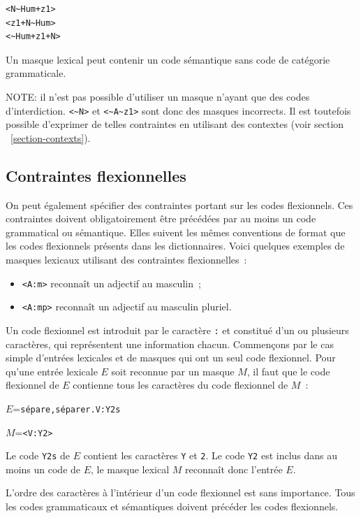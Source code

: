 \begin{verbatim}
<N~Hum+z1>
<z1+N~Hum>
<~Hum+z1+N>
\end{verbatim}

\noindent Un masque lexical peut contenir un code sémantique sans code de catégorie grammaticale.

\bigskip
\noindent NOTE: il n’est pas possible d’utiliser un masque n’ayant que des codes d'interdiction.
\verb+<~N>+ et \verb+<~A~z1>+ sont donc des masques incorrects.
Il est toutefois possible d’exprimer de telles contraintes en utilisant des contextes (voir section
~\ref{section-contexts}).


\subsection{Contraintes flexionnelles}
On peut également spécifier des contraintes portant sur les codes flexionnels. Ces con\-traintes
doivent obligatoirement être précédées par au moins un code grammatical ou sémantique. Elles suivent
les mêmes conventions de format que les codes flexionnels présents dans les dictionnaires.
Voici quelques exemples de masques lexicaux utilisant des contraintes flexionnelles~:

\begin{itemize}
  \item \verb+<A:m>+ reconnaît un adjectif au masculin~;
  \item \verb+<A:mp>+ reconnaît un adjectif au masculin pluriel.
\end{itemize}

\noindent Un code flexionnel est introduit par le caractère \verb+:+ et constitué d'un ou plusieurs
caractères, qui représentent une information chacun. Commençons par le cas simple d'entrées
lexicales et de masques qui ont un seul code flexionnel. Pour qu'une entrée lexicale $E$ soit reconnue
par un masque $M$, il faut que le code flexionnel de $E$ contienne tous les caractères du code flexionnel de $M$~:

\bigskip
$E$=\verb$sépare,séparer.V:Y2s$

$M$=\verb$<V:Y2>$

\bigskip
\noindent Le code \verb+Y2s+ de $E$ contient les caractères \verb+Y+ et \verb+2+. Le
code \verb+Y2+ est inclus dans au moins un code de $E$, le masque lexical $M$ reconnaît donc l’entrée $E$.

\bigskip
\noindent L’ordre des caractères à l’intérieur d’un code flexionnel est sans importance. Tous les codes
grammaticaux et sémantiques doivent précéder les codes flexionnels.

